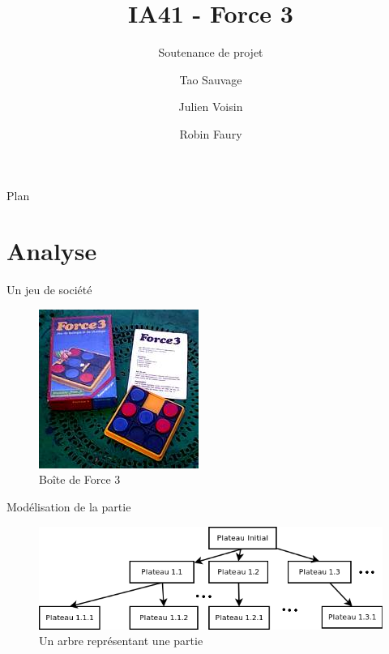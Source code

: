 \documentclass[compress, 12pt]{beamer}
\title{IA41 - Force 3}
\subtitle{Soutenance de projet}
\author[]{Tao Sauvage \and Julien Voisin \and Robin Faury}
\institute[UTBM]{Université de Technologie de Belfort Montbéliard}
\begin{document}
\begin{frame}
	\titlepage
\end{frame}


\begin{frame}{Plan}
    \tableofcontents
\end{frame}


\section{Analyse}

\begin{frame}{Un jeu de société}
  \begin{figure}
    \includegraphics[height=0.6\textheight]{./pix/plateau}
    \centering
    \caption{Boîte de Force 3}
  \end{figure}
\end{frame}


\begin{frame}{Modélisation de la partie}
  \begin{figure}
    \includegraphics[width=\textwidth]{./pix/arbre}
    \centering
    \caption{Un arbre représentant une partie}
  \end{figure}
\end{frame}
\end{document}
